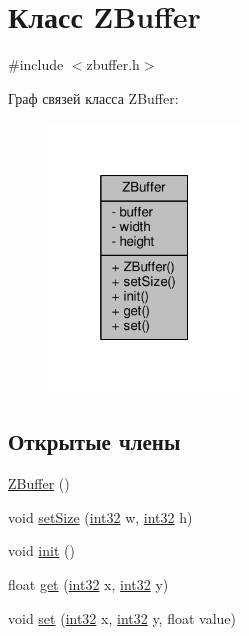 \hypertarget{class_z_buffer}{}\section{Класс Z\+Buffer}
\label{class_z_buffer}


{\ttfamily \#include $<$zbuffer.\+h$>$}



Граф связей класса Z\+Buffer\+:
\nopagebreak
\begin{figure}[H]
\begin{center}
\leavevmode
\includegraphics[width=145pt]{dc/deb/class_z_buffer__coll__graph}
\end{center}
\end{figure}
\subsection*{Открытые члены}
\begin{DoxyCompactItemize}
\item 
\hyperlink{class_z_buffer_a1ddb4afd219393f425cf06d779cd2db9}{Z\+Buffer} ()
\item 
void \hyperlink{class_z_buffer_afadfadfc332f211cd3596e43dc9bcda0}{set\+Size} (\hyperlink{number_8h_a43d43196463bde49cb067f5c20ab8481}{int32} w, \hyperlink{number_8h_a43d43196463bde49cb067f5c20ab8481}{int32} h)
\item 
void \hyperlink{class_z_buffer_a6eba663a5e6a64b74f9c6749d0c19437}{init} ()
\item 
float \hyperlink{class_z_buffer_a0bcc59480cb2df9ceab776ea0bb415ae}{get} (\hyperlink{number_8h_a43d43196463bde49cb067f5c20ab8481}{int32} x, \hyperlink{number_8h_a43d43196463bde49cb067f5c20ab8481}{int32} y)
\item 
void \hyperlink{class_z_buffer_aed7172a077d6f65d8db289a7b64b2b89}{set} (\hyperlink{number_8h_a43d43196463bde49cb067f5c20ab8481}{int32} x, \hyperlink{number_8h_a43d43196463bde49cb067f5c20ab8481}{int32} y, float value)
\end{DoxyCompactItemize}
